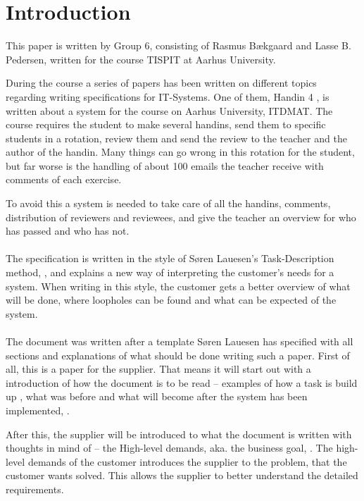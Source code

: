 \documentclass[Main]{subfiles}
\begin{document}
\section{Introduction}


This paper is written by Group 6, consisting of Rasmus Bækgaard and Lasse B. Pedersen, written for the course TISPIT at Aarhus University.


During the course a series of papers has been written on different topics regarding writing specifications for IT-Systems.
One of them, Handin 4 \parencite{HI4}, is written about a system for the course on Aarhus University, ITDMAT. 
The course requires the student to make several handins, send them to specific students in a rotation, review them and send the review to the teacher and the author of the handin.
Many things can go wrong in this rotation for the student, but far worse is the handling of about 100 emails the teacher receive with comments of each exercise.

To avoid this a system is needed to take care of all the handins, comments, distribution of reviewers and reviewees, and give the teacher an overview for who has passed and who has not.
\\
\\
The specification is written in the style of Søren Lauesen's Task-Description method, \parencite{Task}, and explains a new way of interpreting the customer's needs for a system.
When writing in this style, the customer gets a better overview of what will be done, where loopholes can be found and what can be expected of the system.
\\
\\
The document was written after a template Søren Lauesen has specified with all sections and explanations of what should be done writing such a paper.
First of all, this is a paper for the supplier.
That means it will start out with a introduction of how the document is to be read -- examples of how a task is build up \parencite[5-6]{HI4}, what was before and what will become after the system has been implemented, \parencite[4]{HI4}.

After this, the supplier will be introduced to what the document is written with thoughts in mind of -- the High-level demands, aka. the business goal, \parencite[7]{HI4}. 
The high-level demands of the customer introduces the supplier to the problem, that the customer wants solved. This allows the supplier to better understand the detailed requirements.
\end{document}

